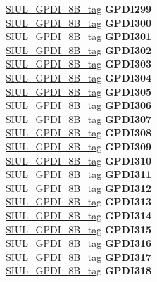 \begin{DoxyCompactItemize}
\begin{tabbing}
\>\>\mbox{\hyperlink{unionSIUL__GPDI__8B__tag}{SIUL\_GPDI\_8B\_tag}} {\bfseries GPDI299}\\
\>\>\mbox{\hyperlink{unionSIUL__GPDI__8B__tag}{SIUL\_GPDI\_8B\_tag}} {\bfseries GPDI300}\\
\>\>\mbox{\hyperlink{unionSIUL__GPDI__8B__tag}{SIUL\_GPDI\_8B\_tag}} {\bfseries GPDI301}\\
\>\>\mbox{\hyperlink{unionSIUL__GPDI__8B__tag}{SIUL\_GPDI\_8B\_tag}} {\bfseries GPDI302}\\
\>\>\mbox{\hyperlink{unionSIUL__GPDI__8B__tag}{SIUL\_GPDI\_8B\_tag}} {\bfseries GPDI303}\\
\>\>\mbox{\hyperlink{unionSIUL__GPDI__8B__tag}{SIUL\_GPDI\_8B\_tag}} {\bfseries GPDI304}\\
\>\>\mbox{\hyperlink{unionSIUL__GPDI__8B__tag}{SIUL\_GPDI\_8B\_tag}} {\bfseries GPDI305}\\
\>\>\mbox{\hyperlink{unionSIUL__GPDI__8B__tag}{SIUL\_GPDI\_8B\_tag}} {\bfseries GPDI306}\\
\>\>\mbox{\hyperlink{unionSIUL__GPDI__8B__tag}{SIUL\_GPDI\_8B\_tag}} {\bfseries GPDI307}\\
\>\>\mbox{\hyperlink{unionSIUL__GPDI__8B__tag}{SIUL\_GPDI\_8B\_tag}} {\bfseries GPDI308}\\
\>\>\mbox{\hyperlink{unionSIUL__GPDI__8B__tag}{SIUL\_GPDI\_8B\_tag}} {\bfseries GPDI309}\\
\>\>\mbox{\hyperlink{unionSIUL__GPDI__8B__tag}{SIUL\_GPDI\_8B\_tag}} {\bfseries GPDI310}\\
\>\>\mbox{\hyperlink{unionSIUL__GPDI__8B__tag}{SIUL\_GPDI\_8B\_tag}} {\bfseries GPDI311}\\
\>\>\mbox{\hyperlink{unionSIUL__GPDI__8B__tag}{SIUL\_GPDI\_8B\_tag}} {\bfseries GPDI312}\\
\>\>\mbox{\hyperlink{unionSIUL__GPDI__8B__tag}{SIUL\_GPDI\_8B\_tag}} {\bfseries GPDI313}\\
\>\>\mbox{\hyperlink{unionSIUL__GPDI__8B__tag}{SIUL\_GPDI\_8B\_tag}} {\bfseries GPDI314}\\
\>\>\mbox{\hyperlink{unionSIUL__GPDI__8B__tag}{SIUL\_GPDI\_8B\_tag}} {\bfseries GPDI315}\\
\>\>\mbox{\hyperlink{unionSIUL__GPDI__8B__tag}{SIUL\_GPDI\_8B\_tag}} {\bfseries GPDI316}\\
\>\>\mbox{\hyperlink{unionSIUL__GPDI__8B__tag}{SIUL\_GPDI\_8B\_tag}} {\bfseries GPDI317}\\
\>\>\mbox{\hyperlink{unionSIUL__GPDI__8B__tag}{SIUL\_GPDI\_8B\_tag}} {\bfseries GPDI318}\\

\end{tabbing}
\end{DoxyCompactItemize}
